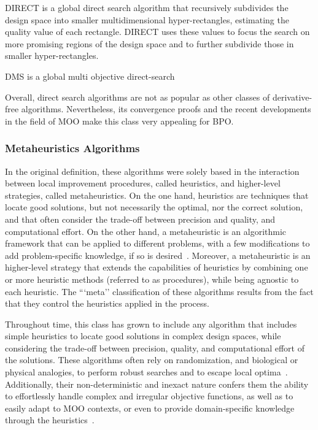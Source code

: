 	DIRECT is a global direct search algorithm that recursively subdivides the design space into smaller multidimensional hyper-rectangles, estimating the quality value of each rectangle. DIRECT uses these values to focus the search on more promising regions of the design space and to further subdivide those in smaller hyper-rectangles. 
	
	DMS \cite{Custodio2010} is a global multi objective direct-search 
	
	Overall, direct search algorithms are not as popular as other classes of derivative-free algorithms. Nevertheless, its convergence proofs and the recent developments in the field of \ac{MOO} make this class very appealing for \ac{BPO}. 
	
	\subsubsection{Metaheuristics Algorithms}
	\label{ssec:metaheuristics}
	
	In the original definition, these algorithms were solely based in the interaction between local improvement procedures, called heuristics, and higher-level strategies, called metaheuristics. On the one hand, heuristics are techniques that locate good solutions, but not necessarily the optimal, nor the correct solution, and that often consider the trade-off between precision and quality, and computational effort. On the other hand, a metaheuristic is an algorithmic framework that can be applied to different problems, with a few modifications to add problem-specific knowledge, if so is desired~\cite{Glover2003Metaheuristics}. Moreover, a metaheuristic is an higher-level strategy that extends the capabilities of heuristics by combining one or more heuristic methods (referred to as procedures), while being agnostic to each heuristic. The ```meta'' classification of these algorithms results from the fact that they control the heuristics applied in the process.
	
	Throughout time, this class has grown to include any algorithm that includes simple heuristics to locate good solutions in complex design spaces, while considering the trade-off between precision, quality, and computational effort of the solutions. These algorithms often rely on randomization, and biological or physical analogies, to perform robust searches and to escape local optima~\cite{Glover2003Metaheuristics}. Additionally, their non-deterministic and inexact nature confers them the ability to effortlessly handle complex and irregular objective functions, as well as to easily adapt to \ac{MOO} contexts, or even to provide domain-specific knowledge through the heuristics~\cite{Wortmann2017GABESTCHOICE}.
	
